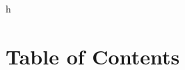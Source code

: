h
\raggedbottom


\pagestyle{empty}

\pagestyle{plain}
\chapter{Table of Contents}
\tableofcontents











